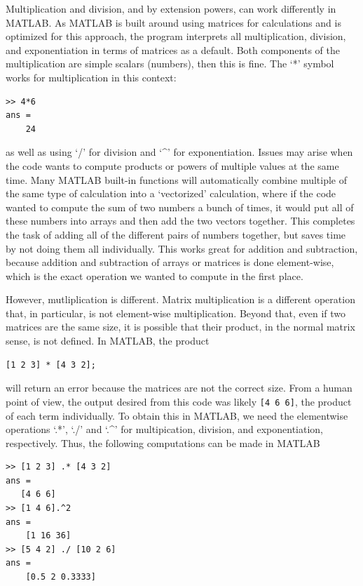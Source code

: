 \documentclass{ximera}
\begin{document}
Multiplication and division, and by extension powers, can work differently in MATLAB. As MATLAB is built around using matrices for calculations and is optimized for this approach, the program interprets all multiplication, division, and exponentiation in terms of matrices as a default. Both components of the multiplication are simple scalars (numbers), then this is fine. The `*' symbol works for multiplication in this context:
\begin{verbatim}
>> 4*6
ans = 
    24
\end{verbatim}
as well as using `/' for division and `\^{ }' for exponentiation. Issues may arise when the code wants to compute products or powers of multiple values at the same time. Many MATLAB built-in functions will automatically combine multiple of the same type of calculation into a `vectorized' calculation, where if the code wanted to compute the sum of two numbers a bunch of times, it would put all of these numbers into arrays and then add the two vectors together. This completes the task of adding all of the different pairs of numbers together, but saves time by not doing them all individually. This works great for addition and subtraction, because addition and subtraction of arrays or matrices is done element-wise, which is the exact operation we wanted to compute in the first place.

However, mutliplication is different. Matrix multiplication is a different operation that, in particular, is not element-wise multiplication. Beyond that, even if two matrices are the same size, it is possible that their product, in the normal matrix sense, is not defined. In MATLAB, the product
\begin{verbatim}
[1 2 3] * [4 3 2];
\end{verbatim}
will return an error because the matrices are not the correct size. From a human point of view, the output desired from this code was likely \texttt{[4 6 6]}, the product of each term individually. To obtain this in MATLAB, we need the elementwise operations `.*', `./' and `.\^{ }' for multipication, division, and exponentiation, respectively. Thus, the following computations can be made in MATLAB
\begin{verbatim}
>> [1 2 3] .* [4 3 2]
ans = 
   [4 6 6]
>> [1 4 6].^2
ans = 
    [1 16 36]
>> [5 4 2] ./ [10 2 6]
ans = 
    [0.5 2 0.3333]
\end{verbatim}
\end{document}
